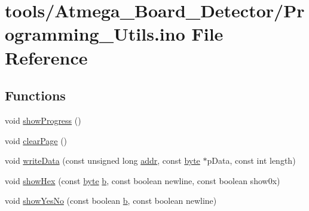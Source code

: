\hypertarget{Programming__Utils_8ino}{\section{tools/\-Atmega\-\_\-\-Board\-\_\-\-Detector/\-Programming\-\_\-\-Utils.ino File Reference}
\label{Programming__Utils_8ino}
}
\subsection*{Functions}
\begin{DoxyCompactItemize}
\item 
void \hyperlink{Programming__Utils_8ino_a0c156db3a6b838bd284535a0b24609fe}{show\-Progress} ()
\item 
void \hyperlink{Programming__Utils_8ino_a4928be8c90cdad9f92a2cb7a8dc09970}{clear\-Page} ()
\item 
void \hyperlink{Programming__Utils_8ino_a8c4d7cac0c4661bb2bc347f1c0fd6794}{write\-Data} (const unsigned long \hyperlink{OWP__DG__1w-adaptor_8ino_a0fc5da2e63a94559429ec9aec32f1831}{addr}, const \hyperlink{Arduino_8h_ab8ef12fab634c171394422d0ee8baf94}{byte} $\ast$p\-Data, const int length)
\item 
void \hyperlink{Programming__Utils_8ino_a185ed56748309b89bff68d661bf51219}{show\-Hex} (const \hyperlink{Arduino_8h_ab8ef12fab634c171394422d0ee8baf94}{byte} \hyperlink{IMU_8cpp_a20f3a6e8a2ba2537edf801801628417b}{b}, const boolean newline, const boolean show0x)
\item 
void \hyperlink{Programming__Utils_8ino_a6ecd0f81d8c7d69fcbfe0ad47bba0ba0}{show\-Yes\-No} (const boolean \hyperlink{IMU_8cpp_a20f3a6e8a2ba2537edf801801628417b}{b}, const boolean newline)
\end{DoxyCompactItemize}


